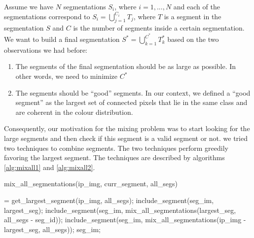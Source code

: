 \documentclass[twoside,11pt]{article}
\begin{document}
Assume we have $N$ segmentations $S_i$, where $i = 1, ..., N$ and each of the
segmentations correspond
to $S_i = \bigcup_{j=1}^{C_i}T_j$, where $T$ is a segment in the segmentation $S$ and $C$
is the number of segments inside
a certain segmentation. We want to build a final segmentation $S^* =
\bigcup_{k=1}^{C^*}T_k^*$
based on the two observations we had before:

\begin{enumerate}
\item
The segments of the final segmentation should be as large as possible. In other
words, we need to minimize
$C^*$
\item
The segments should be ``good'' segments. In our context, we defined a ``good
segment'' as the largest set of connected pixels that lie in the same class and are
coherent in the colour distribution.
\end{enumerate}

Consequently, our motivation for the mixing problem was to start looking for the
large segments and then check if this segment is a valid segment or not. we
tried two techniques to
combine segments. The two techniques perform greedily favoring the largest
segment. The techniques
are described by algorithms \ref{alg:mixall1} and \ref{alg:mixall2}.

\begin{algorithm}
\caption{mix\_all\_segmentations(ip\_img, curr\_segment, all\_segs)}
\label{alg:mixall1}
\begin{algorithmic}
 = get\_largest\_segment(ip\_img, all\_segs);
\STATE include\_segment(seg\_im, largest\_seg);
\ELSE
\STATE include\_segment(seg\_im, mix\_all\_segmentations(largest\_seg, all\_segs
- seg\_id));
\ENDIF
\STATE include\_segment(seg\_im, mix\_all\_segmentations(ip\_img - largest\_seg,
all\_segs));
\RETURN seg\_im;
\end{algorithmic}
\end{algorithm}
\end{document}
